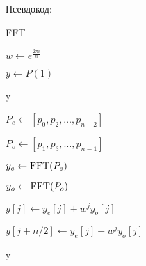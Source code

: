 \documentclass{article}
\begin{document}
  Псевдокод:

    \begin{algorithm}[H]
        \caption{FFT}
        $w\gets e^{\frac{2\pi i}{n}}$

         {
          $y\gets P(1)$

          \Return y
        }

        $P_e\gets [p_0,p_2,\dots,p_{n-2}]$

        $P_o\gets [p_1,p_3,\dots,p_{n-1}]$

        $y_e\gets {\rm FFT}(P_e)$

        $y_o\gets {\rm FFT}(P_o)$

         {
          $y[j]\gets y_e[j] + w^jy_o[j]$

          $y[j + n/2]\gets y_e[j] - w^jy_o[j]$
        }

        \Return y
    \end{algorithm}
\end{document}
